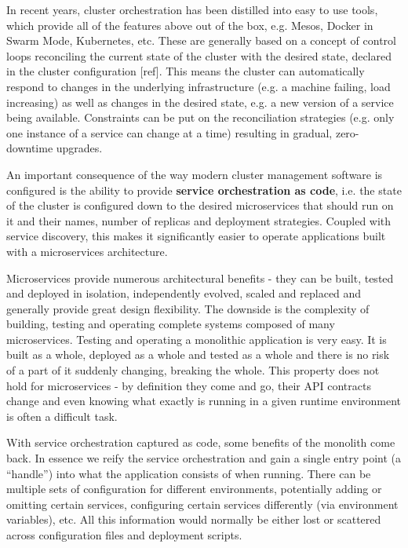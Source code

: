 \documentclass[reprint,amsmath,amssymb,aps]{revtex4-1}
\begin{document}
In recent years, cluster orchestration has been distilled into easy to use tools, which provide all of the features above out of the box, e.g. Mesos, Docker in Swarm Mode, Kubernetes, etc. These are generally based on a concept of control loops reconciling the current state of the cluster with the desired state, declared in the cluster configuration [ref]. This means the cluster can automatically respond to changes in the underlying infrastructure (e.g. a machine failing, load increasing) as well as changes in the desired state, e.g. a new version of a service being available. Constraints can be put on the reconciliation strategies (e.g. only one instance of a service can change at a time) resulting in gradual, zero-downtime upgrades.

An important consequence of the way modern cluster management software is configured is the ability to provide \textbf{service orchestration as code}, i.e. the state of the cluster is configured down to the desired microservices that should run on it and their names, number of replicas and deployment strategies. Coupled with service discovery, this makes it significantly easier to operate applications built with a microservices architecture.

Microservices provide numerous architectural benefits - they can be built, tested and deployed in isolation, independently evolved, scaled and replaced and generally provide great design flexibility. The downside is the complexity of building, testing and operating complete systems composed of many microservices. Testing and operating a monolithic application is very easy. It is built as a whole, deployed as a whole and tested as a whole and there is no risk of a part of it suddenly changing, breaking the whole. This property does not hold for microservices - by definition they come and go, their API contracts change and even knowing what exactly is running in a given runtime environment is often a difficult task.

With service orchestration captured as code, some benefits of the monolith come back. In essence we reify the service orchestration and gain a single entry point (a “handle”) into what the application consists of when running. There can be multiple sets of configuration for different environments, potentially adding or omitting certain services, configuring certain services differently (via environment variables), etc. All this information would normally be either lost or scattered across configuration files and deployment scripts.
\end{document}
